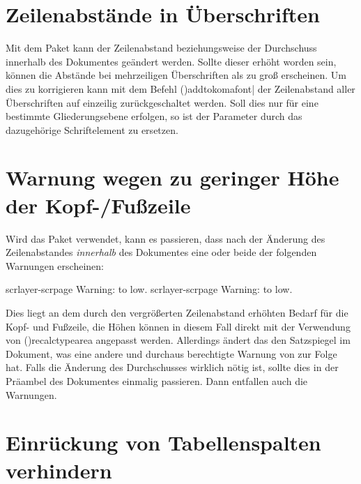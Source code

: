 \section{%
  Zeilenabstände in Überschriften%
  \label{sec:tips:headings}%
}

Mit dem Paket  kann der Zeilenabstand beziehungsweise der 
Durchschuss innerhalb des Dokumentes geändert werden. Sollte dieser erhöht 
worden sein, können die Abstände bei mehrzeiligen Überschriften als zu groß 
erscheinen. Um dies zu korrigieren kann mit dem Befehl 
\Macro(){addtokomafont|%
}
der Zeilenabstand aller Überschriften auf einzeilig zurückgeschaltet werden. 
Soll dies nur für eine bestimmte Gliederungsebene erfolgen, so ist der 
Parameter  durch das dazugehörige Schriftelement zu 
ersetzen.



\section{%
  Warnung wegen zu geringer Höhe der Kopf-/Fußzeile%
  \label{sec:tips:headline}%
}

Wird das Paket  verwendet, kann es passieren, dass nach der 
Änderung des Zeilenabstandes \emph{innerhalb} des Dokumentes eine oder beide 
der folgenden Warnungen erscheinen:
%
\begin{quoting}
\begin{Code}
scrlayer-scrpage Warning: \headheight to low.
scrlayer-scrpage Warning: \footheight to low.
\end{Code}
\end{quoting}
%
Dies liegt an dem durch den vergrößerten Zeilenabstand erhöhten Bedarf für die
Kopf- und Fußzeile, die Höhen können in diesem Fall direkt mit der Verwendung 
von \Macro(){recalctypearea} angepasst werden. Allerdings 
ändert das den Satzspiegel im Dokument, was eine andere und durchaus 
berechtigte Warnung von  zur Folge hat. Falls die Änderung 
des Durchschusses wirklich nötig ist, sollte dies in der Präambel des 
Dokumentes einmalig passieren. Dann entfallen auch die Warnungen.



\section{%
  Einrückung von Tabellenspalten verhindern%
  \label{sec:tips:table}%
}


